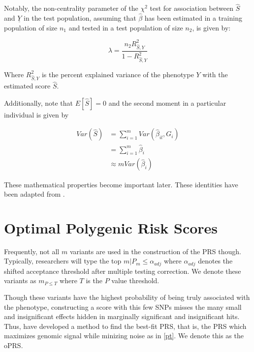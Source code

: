 Notably, the non-centrality parameter of the $\chi^2$ test for association between $\hat{S}$ and $\underline{Y}$ in the test population, assuming that $\hat{\beta}$ has been estimated in a training population of size $n_1$ and tested in a test population of size $n_2$, is given by:

$$ \lambda = \frac{n_2 R^2_{\hat{S}, Y}}{1 - R^2_{\hat{S}, Y}} $$

Where $R^2_{\hat{S}, Y}$ is the percent explained variance of the phenotype $Y$ with the estimated score $\hat{S}$. 

Additionally, note that $E[\hat{S}] = 0$ and the second moment in a particular individual is given by

$$ \begin{aligned} Var(\hat{S}) &= \sum^m_{i=1} Var(\hat{\beta}_{il}, G_{i}) \\ &= \sum^m_{i=1} \hat{\beta}_{i} \\ &\approx m Var(\hat{\beta}_{i}) \end{aligned} $$

These mathematical properties become important later. These identities have been adapted from \cite{Dudbridge2013}.

\section{Optimal Polygenic Risk Scores}
\label{oPRS}

Frequently, not all $m$ variants are used in the construction of the \ac{PRS} though. Typically, researchers will type the top $m | P_m \leq \alpha_{adj}$ where $\alpha_{adj}$ denotes the shifted acceptance threshold after multiple testing correction. We denote these variants as $m_{P \leq T}$ where $T$ is the $P$ value threshold. 

Though these variants have the highest probability of being truly associated with the phenotype, constructing a score with this few \ac{SNP}s misses the many small and insignificant effects hidden in marginally significant and insignificant hits. Thus, \cite{Euesden2014} have developed a method to find the best-fit \ac{PRS}, that is, the PRS which maximizes genomic signal while minizing noise as in \ref{pt}. We denote this as the \ac{oPRS}. 


